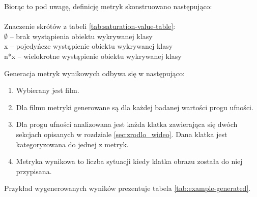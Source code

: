 Biorąc to pod uwagę, definicję metryk skonstruowano następująco: \\ \\ \noindent
Znaczenie skrótów z tabeli \ref{tab:saturation-value-table}: \\
$\emptyset$ -- brak wystąpienia obiektu wykrywanej klasy \\
x -- pojedyńcze wystąpienie obiektu wykrywanej klasy \\
n*x -- wielokrotne wystąpienie obiektu wykrywanej klasy


Generacja metryk wynikowych odbywa się w następująco:
\begin{enumerate}
    \item Wybierany jest film.
    \item Dla filmu metryki generowane są dla każdej badanej wartości progu ufności.
    \item Dla progu ufności analizowana jest każda klatka zawierająca się dwóch sekcjach opisanych w rozdziale \ref{sec:zrodlo_wideo}. Dana klatka jest kategoryzowana do jednej z metryk.
    \item Metryka wynikowa to liczba sytuacji kiedy klatka obrazu została do niej przypisana.
\end{enumerate} 
Przykład wygenerowanych wyników prezentuje tabela \ref{tab:example-generated}.



